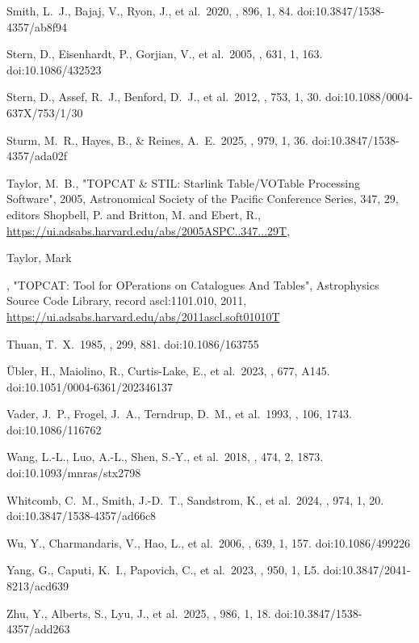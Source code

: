 \documentclass[twocolumn]{aastex63}
\begin{document}
{\begin{thebibliography}{}
{ Smith, L.~J., Bajaj, V., Ryon, J., et al.\ 2020, \apj, 896, 1, 84. doi:10.3847/1538-4357/ab8f94

 Stern, D., Eisenhardt, P., Gorjian, V., et al.\ 2005, \apj, 631, 1, 163. doi:10.1086/432523

 Stern, D., Assef, R.~J., Benford, D.~J., et al.\ 2012, \apj, 753, 1, 30. doi:10.1088/0004-637X/753/1/30

 Sturm, M.~R., Hayes, B., \& Reines, A.~E.\ 2025, \apj, 979, 1, 36. doi:10.3847/1538-4357/ada02f

 {{Taylor}, M.~B.}, "{TOPCAT \& STIL: Starlink Table/VOTable Processing Software}", 2005,
         {Astronomical Society of the Pacific Conference Series}, {347}, {29},  editors  {{Shopbell}, P. and {Britton}, M. and {Ebert}, R.},
      \url {https://ui.adsabs.harvard.edu/abs/2005ASPC..347...29T},

 {Taylor}, Mark}, "{TOPCAT: Tool for OPerations on Catalogues And Tables}", {Astrophysics Source Code Library, record ascl:1101.010}, 2011, \url {https://ui.adsabs.harvard.edu/abs/2011ascl.soft01010T} 

 Thuan, T.~X.\ 1985, \apj, 299, 881. doi:10.1086/163755

 {\"U}bler, H., Maiolino, R., Curtis-Lake, E., et al.\ 2023, \aap, 677, A145. doi:10.1051/0004-6361/202346137

 Vader, J.~P., Frogel, J.~A., Terndrup, D.~M., et al.\ 1993, \aj, 106, 1743. doi:10.1086/116762

 Wang, L.-L., Luo, A.-L., Shen, S.-Y., et al.\ 2018, \mnras, 474, 2, 1873. doi:10.1093/mnras/stx2798

 Whitcomb, C.~M., Smith, J.-D.~T., Sandstrom, K., et al.\ 2024, \apj, 974, 1, 20. doi:10.3847/1538-4357/ad66c8

 Wu, Y., Charmandaris, V., Hao, L., et al.\ 2006, \apj, 639, 1, 157. doi:10.1086/499226

 Yang, G., Caputi, K.~I., Papovich, C., et al.\ 2023, \apjl, 950, 1, L5. doi:10.3847/2041-8213/acd639

 Zhu, Y., Alberts, S., Lyu, J., et al.\ 2025, \apj, 986, 1, 18. doi:10.3847/1538-4357/add263


\end{thebibliography}}
\end{document}
